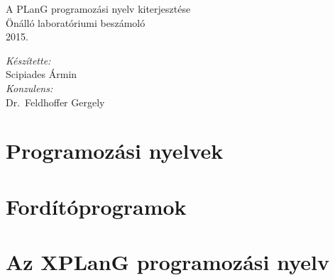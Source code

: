 \documentclass[11pt,a4paper]{article}
\theoremstyle{plain}
\begin{document}
\begin{titlepage}
\newlength\drop
\setlength\drop{0.08\textheight}

\centering
\vspace*{2\drop}

{\huge A PLanG programozási nyelv kiterjesztése}\\[\baselineskip]
{Önálló laboratóriumi beszámoló}\\[\baselineskip]

\vspace*{0.5\drop}
\large 2015.

\vfill
\begin{flushright} \large
\emph{Készítette:}\\
Scipiades Ármin\\[\baselineskip]
\emph{Konzulens:} \\
Dr.~Feldhoffer Gergely
\end{flushright}
\vspace*{\drop}

\end{titlepage}



\thispagestyle{empty}
\tableofcontents

\newpage
\setcounter{page}{1}
\section{Programozási nyelvek}
\label{sec:proglang}


\newpage
\section{Fordítóprogramok}
\label{sec:fordprog}


\newpage
\section{Az XPLanG programozási nyelv}
\label{sec:xplang}



\newpage
\printbibliography
\end{document}
